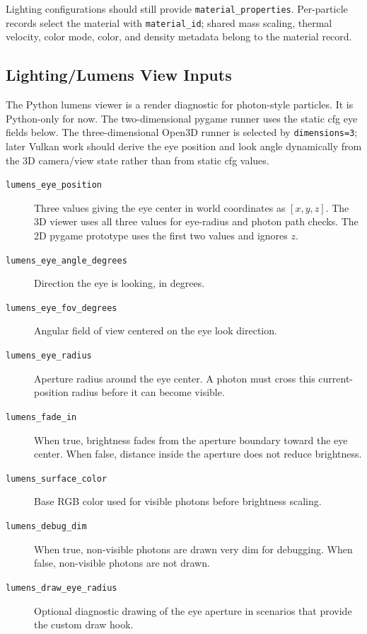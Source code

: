 Lighting configurations should still provide \texttt{material\_properties}.
Per-particle records select the material with \texttt{material\_id}; shared
mass scaling, thermal velocity, color mode, color, and density metadata belong to
the material record.

\subsection{Lighting/Lumens View Inputs}

The Python lumens viewer is a render diagnostic for photon-style particles.
It is Python-only for now.  The two-dimensional pygame runner uses the static
cfg eye fields below.  The three-dimensional Open3D runner is selected by
\texttt{dimensions=3}; later Vulkan work should derive the eye position and
look angle dynamically from the 3D camera/view state rather than from static
cfg values.

\begin{description}
    \item[\texttt{lumens\_eye\_position}] Three values giving the eye center
    in world coordinates as \([x,y,z]\).  The 3D viewer uses all three values
    for eye-radius and photon path checks.  The 2D pygame prototype uses the
    first two values and ignores \(z\).
    \item[\texttt{lumens\_eye\_angle\_degrees}] Direction the eye is looking,
    in degrees.
    \item[\texttt{lumens\_eye\_fov\_degrees}] Angular field of view centered
    on the eye look direction.
    \item[\texttt{lumens\_eye\_radius}] Aperture radius around the eye center.
    A photon must cross this current-position radius before it can become
    visible.
    \item[\texttt{lumens\_fade\_in}] When true, brightness fades from the
    aperture boundary toward the eye center.  When false, distance inside the
    aperture does not reduce brightness.
    \item[\texttt{lumens\_surface\_color}] Base RGB color used for visible
    photons before brightness scaling.
    \item[\texttt{lumens\_debug\_dim}] When true, non-visible photons are
    drawn very dim for debugging.  When false, non-visible photons are not
    drawn.
    \item[\texttt{lumens\_draw\_eye\_radius}] Optional diagnostic drawing of
    the eye aperture in scenarios that provide the custom draw hook.
\end{description}

